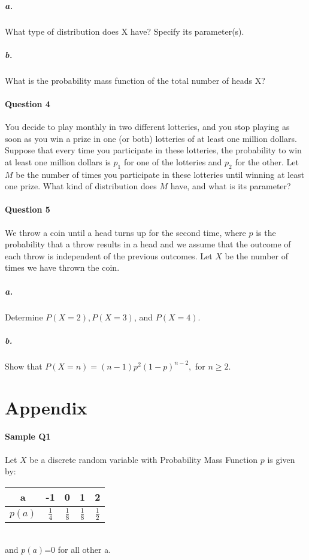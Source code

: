 \documentclass[11pt]{article} %
\begin{document}
\subparagraph*{a.} What type of distribution does X have? Specify its parameter(s). 
\subparagraph*{b.} What is the probability mass function of the total number of heads X?

\paragraph*{\bf Question 4}
You decide to play monthly in two different lotteries, and you stop playing as soon as you win a prize in one (or both) lotteries of
at least one million dollars. Suppose that every time you participate in these lotteries, the probability to win at least one million dollars is $p_1$ for one of the lotteries and $p_2$ for the other. Let $M$ be the number of times you participate in these lotteries until winning at least one prize. What kind of distribution does $M$ have, and what is its parameter?

\paragraph*{\bf Question 5}
We throw a coin until a head turns up for the second time, where $p$ is the probability that a throw results in a head and we assume
that the outcome of each throw is independent of the previous outcomes. Let $X$ be the number of times we have thrown the coin.
\subparagraph*{a.} Determine $P(X = 2), P(X = 3)$, and $P(X = 4)$.
\subparagraph*{b.} Show that $P(X = n) = (n - 1)p^2(1-p)^{n-2},$ for $n \ge 2.$

\newpage

\section*{\bf Appendix}
\paragraph*{\bf Sample Q1} Let $X$ be a discrete random variable with Probability Mass Function $p$ is given by: \\
\begin{table}[h!]
\begin{center}
\begin{tabular}{c|cccc} \hline
a & -1 & 0 & 1 & 2 \\ \hline
$p(a)$ & $\frac{1}{4}$ & $\frac{1}{8}$ & $\frac{1}{8}$ & $\frac{1}{2}$ \\ \hline
\end{tabular}
\label{ta1}
\end{center}
\end{table}
\\ and $p(a)$=0 for all other a. 
\end{document}
